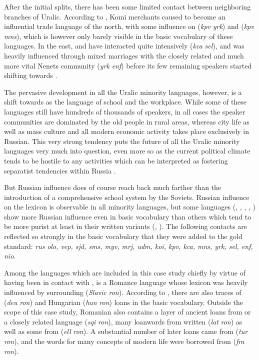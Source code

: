 After the initial splits, there has been some limited contact between neighboring branches of Uralic. According to \cite{hausenberg1998}, Komi merchants caused  to become an influential trade language of the north, with some influence on  (\textit{kpv} \arrowOA \textit{yrk}) and  (\textit{kpv} \arrowOA \textit{mns}), which is however only barely visible in the basic vocabulary of these languages. In the east,  and  have interacted quite intensively (\textit{kca} \arrowOA \textit{sel}), and  was heavily influenced through mixed marriages with the closely related and much more vital Nenets community (\textit{yrk} \arrowOA \textit{enf}) before its few remaining speakers started shifting towards  \citep{siegl2013}.

The pervasive development in all the Uralic minority languages, however, is a shift towards  as the language of school and the workplace. While some of these languages still have hundreds of thousands of speakers, in all cases the speaker communities are dominated by the old people in rural areas, whereas city life as well as mass culture and all modern economic activity takes place exclusively in Russian. This very strong tendency puts the future of all the Uralic minority languages very much into question, even more so as the current political climate tends to be hostile to any activities which can be interpreted as fostering separatist tendencies within Russia \citep{taagepera2013}.

But Russian influence does of course reach back much farther than the introduction of a comprehensive school system by the Soviets. Russian influence on the lexicon is observable in all minority languages, but some languages (, , , , ) show more Russian influence even in basic vocabulary than others which tend to be more purist at least in their written variants (, ). The following contacts are reflected so strongly in the basic vocabulary that they were added to the gold standard: \textit{rus} \arrowLA \textit{olo, vep, sjd, sms, myv, mrj, udm, koi, kpv, kca, mns, yrk, sel, enf, nio}.

Among the languages which are included in this case study chiefly by virtue of having been in contact with ,  is a Romance language whose lexicon was heavily influenced by surrounding  (\textit{Slavic} \arrowOA \textit{ron}). According to \cite{schulte2009}, there are also traces of  (\textit{deu} \arrowOA \textit{ron}) and Hungarian (\textit{hun} \arrowLA \textit{ron}) loans in the basic vocabulary. Outside the scope of this case study, Romanian also contains a layer of ancient loans from  or a closely related language (\textit{sqi} \arrowOA \textit{ron}), many loanwords from written  (\textit{lat} \arrowOA \textit{ron}) as well as some from  (\textit{ell} \arrowOA \textit{ron}). A substantial number of later loans came from  (\textit{tur} \arrowLA \textit{ron}), and the words for many concepts of modern life were borrowed from  (\textit{fra} \arrowOA \textit{ron}).

